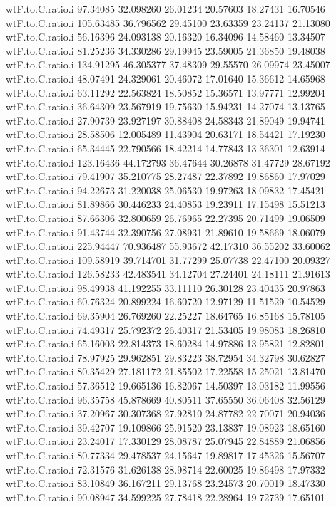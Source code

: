 \documentclass[11pt]{article} %
\begin{document}
\begin{Schunk}
\begin{Soutput}
wtF.to.C.ratio.i  97.34085 32.098260 26.01234 20.57603 18.27431 16.70546
wtF.to.C.ratio.i 105.63485 36.796562 29.45100 23.63359 23.24137 21.13080
wtF.to.C.ratio.i  56.16396 24.093138 20.16320 16.34096 14.58460 13.34507
wtF.to.C.ratio.i  81.25236 34.330286 29.19945 23.59005 21.36850 19.48038
wtF.to.C.ratio.i 134.91295 46.305377 37.48309 29.55570 26.09974 23.45007
wtF.to.C.ratio.i  48.07491 24.329061 20.46072 17.01640 15.36612 14.65968
wtF.to.C.ratio.i  63.11292 22.563824 18.50852 15.36571 13.97771 12.99204
wtF.to.C.ratio.i  36.64309 23.567919 19.75630 15.94231 14.27074 13.13765
wtF.to.C.ratio.i  27.90739 23.927197 30.88408 24.58343 21.89049 19.94741
wtF.to.C.ratio.i  28.58506 12.005489 11.43904 20.63171 18.54421 17.19230
wtF.to.C.ratio.i  65.34445 22.790566 18.42214 14.77843 13.36301 12.63914
wtF.to.C.ratio.i 123.16436 44.172793 36.47644 30.26878 31.47729 28.67192
wtF.to.C.ratio.i  79.41907 35.210775 28.27487 22.37892 19.86860 17.97029
wtF.to.C.ratio.i  94.22673 31.220038 25.06530 19.97263 18.09832 17.45421
wtF.to.C.ratio.i  81.89866 30.446233 24.40853 19.23911 17.15498 15.51213
wtF.to.C.ratio.i  87.66306 32.800659 26.76965 22.27395 20.71499 19.06509
wtF.to.C.ratio.i  91.43744 32.390756 27.08931 21.89610 19.58669 18.06079
wtF.to.C.ratio.i 225.94447 70.936487 55.93672 42.17310 36.55202 33.60062
wtF.to.C.ratio.i 109.58919 39.714701 31.77299 25.07738 22.47100 20.09327
wtF.to.C.ratio.i 126.58233 42.483541 34.12704 27.24401 24.18111 21.91613
wtF.to.C.ratio.i  98.49938 41.192255 33.11110 26.30128 23.40435 20.97863
wtF.to.C.ratio.i  60.76324 20.899224 16.60720 12.97129 11.51529 10.54529
wtF.to.C.ratio.i  69.35904 26.769260 22.25227 18.64765 16.85168 15.78105
wtF.to.C.ratio.i  74.49317 25.792372 26.40317 21.53405 19.98083 18.26810
wtF.to.C.ratio.i  65.16003 22.814373 18.60284 14.97886 13.95821 12.82801
wtF.to.C.ratio.i  78.97925 29.962851 29.83223 38.72954 34.32798 30.62827
wtF.to.C.ratio.i  80.35429 27.181172 21.85502 17.22558 15.25021 13.81470
wtF.to.C.ratio.i  57.36512 19.665136 16.82067 14.50397 13.03182 11.99556
wtF.to.C.ratio.i  96.35758 45.878669 40.80511 37.65550 36.06408 32.56129
wtF.to.C.ratio.i  37.20967 30.307368 27.92810 24.87782 22.70071 20.94036
wtF.to.C.ratio.i  39.42707 19.109866 25.91520 23.13837 19.08923 18.65160
wtF.to.C.ratio.i  23.24017 17.330129 28.08787 25.07945 22.84889 21.06856
wtF.to.C.ratio.i  80.77334 29.478537 24.15647 19.89817 17.45326 15.56707
wtF.to.C.ratio.i  72.31576 31.626138 28.98714 22.60025 19.86498 17.97332
wtF.to.C.ratio.i  83.10849 36.167211 29.13768 23.24573 20.70019 18.47330
wtF.to.C.ratio.i  90.08947 34.599225 27.78418 22.28964 19.72739 17.65101

\end{Soutput}
\end{Schunk}
\end{document}
